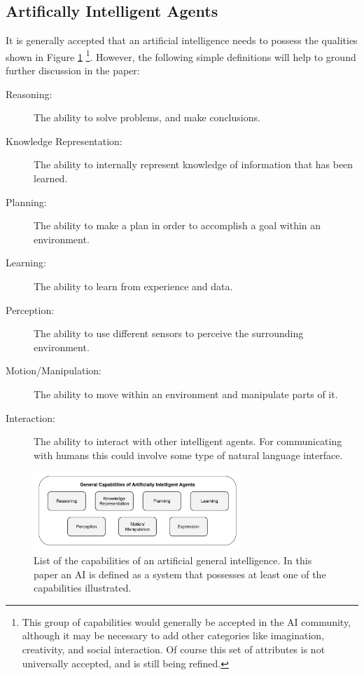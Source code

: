 \subsection{Artifically Intelligent Agents}
    It is generally accepted that an artificial intelligence needs to possess the qualities shown in Figure \ref{fig:AIcapabilities} \cite{Russell2010-wv,Nilsson2009-rp,Luger2008-vf}\footnote{This group of capabilities would generally be accepted in the AI community, although it may be necessary to add other categories like imagination, creativity, and social interaction. Of course this set of attributes is not universally accepted, and is still being refined.}. However, the following simple definitions will help to ground further discussion in the paper:

    \begin{description}
        \item [Reasoning:] The ability to solve problems, and make conclusions.
        \item [Knowledge Representation:] The ability to internally represent knowledge of information that has been learned.
        \item [Planning:] The ability to make a plan in order to accomplish a goal within an environment.
        \item [Learning:] The ability to learn from experience and data.
        \item [Perception:] The ability to use different sensors to perceive the surrounding environment.
        \item [Motion/Manipulation:] The ability to move within an environment and manipulate parts of it.
        \item [Interaction:] The ability to interact with other intelligent agents. For communicating with humans this could involve some type of natural language interface.
    \end{description}

	\begin{figure}[htbp]
    	\centering
     	\includegraphics[width=0.7\textwidth]{Figures/AI_capabilities}
    	\caption{List of the capabilities of an artificial general intelligence. In this paper an AI is defined as a system that possesses at least one of the capabilities illustrated.}
        \label{fig:AIcapabilities}
    \end{figure}

